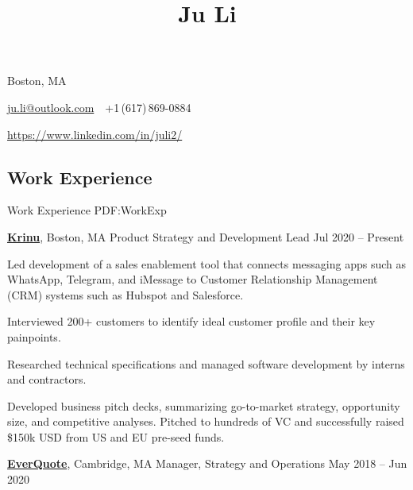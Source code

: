 \documentclass[letterpaper,10pt,oneside]{article}
\newcommand{\CVAuthor}{Ju Li}
\begin{document}

\title{\CVAuthor}

\begin{subtitle}
Boston, MA
\par
\href{mailto:ju.li@outlook.com}
{ju.li@outlook.com}
\,\SubBulletSymbol\,
+1\,(617)\,869-0884
\par 
\href{https://www.linkedin.com/in/juli2/}{https://www.linkedin.com/in/juli2/}
\end{subtitle}

\begin{body}


\section
{Work\newline
Experience}
{Work Experience}
{PDF:WorkExp}

\href{https://krinu.com/}
{\textbf{Krinu}},
Boston, MA
\GapNoBreak
Product Strategy and Development Lead
\hfill
Jul 2020 -- Present
\begin{flushleft}

\BulletItem Led development of a sales enablement tool that connects messaging apps such as WhatsApp, Telegram, and iMessage to Customer Relationship Management (CRM) systems such as Hubspot and Salesforce. 

\vspace{0.3em} \SubBulletItem Interviewed 200+ customers to identify ideal customer profile and their key painpoints. 

\vspace{0.3em} \SubBulletItem Researched technical specifications and managed software development by interns and contractors.

\vspace{0.75em}
\BulletItem Developed business pitch decks, summarizing go-to-market strategy, opportunity size, and competitive analyses. Pitched to hundreds of VC and successfully raised \$150k USD from US and EU pre-seed funds. 

\end{flushleft}


\href{http://www.everquote.com/}
{\textbf{EverQuote}},
Cambridge, MA
\GapNoBreak
Manager, Strategy and Operations
\hfill
May 2018 -- Jun 2020
\begin{flushleft}


\end{flushleft}
\end{body}
\end{document}
